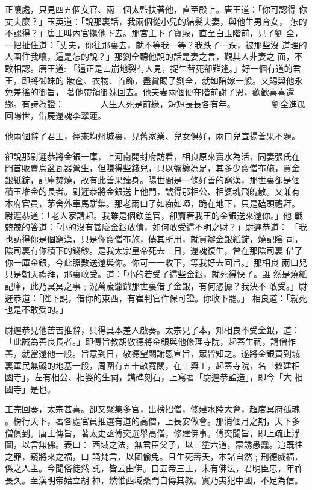 \begin{pinyinscope}
{正嚷處，只見四五個女官、兩三個太監扶著他，直至殿上。唐王道：「你可認得
你丈夫麼？」玉英道：「說那裏話，我兩個從小兒的結髮夫妻，與他生男育女，
怎的不認得？」唐王叫內官攙他下去。那宮主下了寶殿，直至白玉階前，見了劉
全，一把扯住道：「丈夫，你往那裏去，就不等我一等？我跌了一跌，被那些沒
道理的人圍住我嚷，這是怎的說？」那劉全聽他說的話是妻之言，觀其人非妻之
面，不敢相認。唐王道:
「這正是山崩地裂有人見，捉生替死卻難逢。」好一個有道的君王，即將御妹的
妝奩、衣物、首飾，盡賞賜了劉全，就如陪嫁一般。又賜與他永免差徭的御旨，
著他帶領御妹回去。他夫妻兩個便在階前謝了恩，歡歡喜喜還鄉。有詩為證：
　　　　人生人死是前緣，短短長長各有年。
　　　　劉全進瓜回陽世，借屍還魂李翠蓮。

他兩個辭了君王，徑來均州城裏，見舊家業、兒女俱好，兩口兒宣揚善果不題。

卻說那尉遲恭將金銀一庫，上河南開封府訪看，相良原來賣水為活，同妻張氏在
門首販賣烏盆瓦器營生，但賺得些錢兒，只以盤纏為足，其多少齋僧布施，買金
銀紙錠，記庫焚燒，故有此善果臻身。陽世間是一條好善的窮漢，那世裏卻是個
積玉堆金的長者。尉遲恭將金銀送上他門，諕得那相公、相婆魂飛魄散。又兼有
本府官員，茅舍外車馬駢集。那老兩口子如痴如啞，跪在地下，只是磕頭禮拜。
尉遲恭道：「老人家請起。我雖是個欽差官，卻齎著我王的金銀送來還你。」他
戰兢兢的答道：「小的沒有甚麼金銀放債，如何敢受這不明之財？」尉遲恭道：
「我也訪得你是個窮漢，只是你齋僧布施，儘其所用，就買辦金銀紙錠，燒記陰
司，陰司裏有你積下的錢鈔。是我太宗皇帝死去三日，還魂復生，曾在那陰司裏
借了你一庫金銀，今此照數送還與你。你可一一收下，等我好去回旨。」那相良
兩口兒只是朝天禮拜，那裏敢受。道：「小的若受了這些金銀，就死得快了。雖
然是燒紙記庫，此乃冥冥之事﹔況萬歲爺爺那世裏借了金銀，有何憑據？我決不
敢受。」尉遲恭道：「陛下說，借你的東西，有崔判官作保可證。你收下罷。」
相良道：「就死也是不敢受的。」

尉遲恭見他苦苦推辭，只得具本差人啟奏。太宗見了本，知相良不受金銀，道：
「此誠為善良長者。」即傳旨教胡敬德將金銀與他修理寺院，起蓋生祠，請僧作
善，就當還他一般。旨意到日，敬德望闕謝恩宣旨，眾皆知之。遂將金銀買到城
裏軍民無礙的地基一段，周圍有五十畝寬闊，在上興工，起蓋寺院，名「敕建相
國寺」，左有相公、相婆的生祠，鐫碑刻石，上寫著「尉遲恭監造」，即今「大
相國寺」是也。

工完回奏，太宗甚喜。卻又聚集多官，出榜招僧，修建水陸大會，超度冥府孤魂
。榜行天下，著各處官員推選有道的高僧，上長安做會。那消個月之期，天下多
僧俱到。唐王傳旨，著太史丞傅奕選舉高僧，修建佛事。傅奕聞旨，即上疏止浮
圖，以言無佛。表曰：
西域之法，無君臣父子，以三塗六道，蒙誘愚蠢。追既往之罪，窺將來之福，口
誦梵言，以圖偷免。且生死壽夭，本諸自然﹔刑德威福，係之人主。今聞俗徒然
託，皆云由佛。自五帝三王，未有佛法，君明臣忠，年祚長久。至漢明帝始立胡
神，然惟西域桑門自傳其教。實乃夷犯中國，不足為信。

}
\end{pinyinscope}
